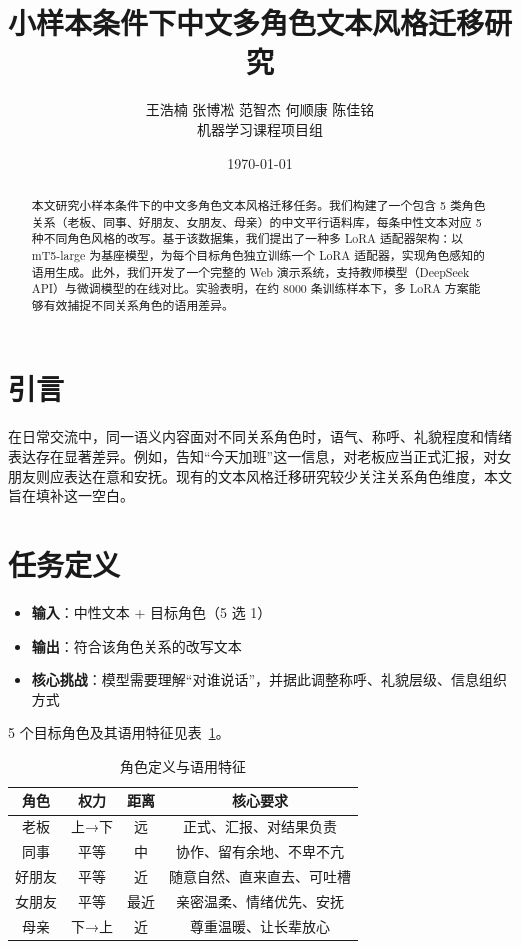 \documentclass[12pt,a4paper]{article}
\title{\bfseries 小样本条件下中文多角色文本风格迁移研究}
\author{
    王浩楠 \quad 张博凇 \quad 范智杰 \quad 何顺康 \quad 陈佳铭 \\[4pt]
    \small 机器学习课程项目组
}
\date{\today}
\begin{document}
\maketitle

\begin{abstract}
本文研究小样本条件下的中文多角色文本风格迁移任务。我们构建了一个包含 5 类角色关系（老板、同事、好朋友、女朋友、母亲）的中文平行语料库，每条中性文本对应 5 种不同角色风格的改写。基于该数据集，我们提出了一种多 LoRA 适配器架构：以 mT5-large 为基座模型，为每个目标角色独立训练一个 LoRA 适配器，实现角色感知的语用生成。此外，我们开发了一个完整的 Web 演示系统，支持教师模型（DeepSeek API）与微调模型的在线对比。实验表明，在约 8000 条训练样本下，多 LoRA 方案能够有效捕捉不同关系角色的语用差异。
\end{abstract}

\section{引言}

在日常交流中，同一语义内容面对不同关系角色时，语气、称呼、礼貌程度和情绪表达存在显著差异。例如，告知“今天加班”这一信息，对老板应当正式汇报，对女朋友则应表达在意和安抚。现有的文本风格迁移研究较少关注关系角色维度，本文旨在填补这一空白。

\section{任务定义}

\begin{itemize}[leftmargin=2em]
    \item \textbf{输入}：中性文本 + 目标角色（5 选 1）
    \item \textbf{输出}：符合该角色关系的改写文本
    \item \textbf{核心挑战}：模型需要理解“对谁说话”，并据此调整称呼、礼貌层级、信息组织方式
\end{itemize}

5 个目标角色及其语用特征见表~\ref{tab:roles}。

\begin{table}[H]
\centering
\caption{角色定义与语用特征}
\label{tab:roles}
\begin{tabular}{c|c|c|c}
\toprule
角色 & 权力 & 距离 & 核心要求 \\
\midrule
老板   & 上→下 & 远 & 正式、汇报、对结果负责 \\
同事   & 平等   & 中 & 协作、留有余地、不卑不亢 \\
好朋友 & 平等   & 近 & 随意自然、直来直去、可吐槽 \\
女朋友 & 平等   & 最近 & 亲密温柔、情绪优先、安抚 \\
母亲   & 下→上 & 近 & 尊重温暖、让长辈放心 \\
\bottomrule
\end{tabular}
\end{table}
\end{document}
